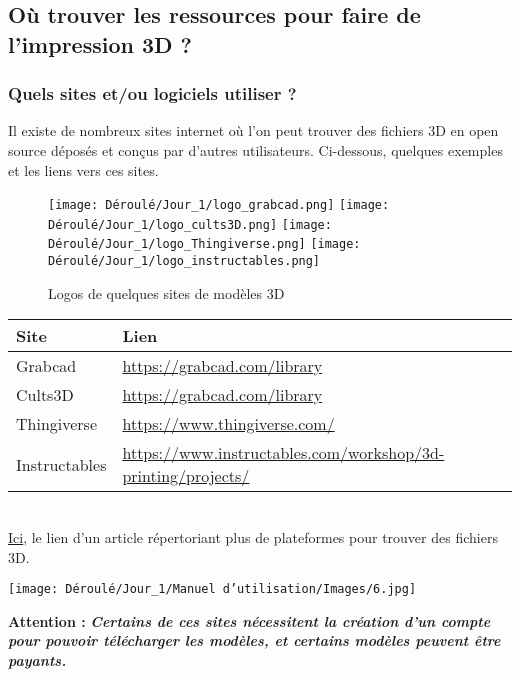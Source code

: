 \subsection{Où trouver les ressources pour faire de l'impression 3D ?}

\subsubsection{Quels sites et/ou logiciels utiliser ?}
\begin{flushleft}
    Il existe de nombreux sites internet où l'on peut trouver des fichiers 3D en open source déposés et conçus par d'autres utilisateurs. Ci-dessous, quelques exemples et les liens vers ces sites.\\
\end{flushleft}

\begin{flushleft}
    \begin{figure}[!h]
        \begin{center}
        \texttt{[image: Déroulé/Jour\_1/logo\_grabcad.png]}
        \texttt{[image: Déroulé/Jour\_1/logo\_cults3D.png]}
        \texttt{[image: Déroulé/Jour\_1/logo\_Thingiverse.png]}
        \texttt{[image: Déroulé/Jour\_1/logo\_instructables.png]}\\
        \caption[Sites de modèles 3D]{Logos de quelques sites de modèles 3D}
        \label{fig:my_label}
        \end{center}
    \end{figure}
    
    
    \vskip0.5cm
    \begin{tabular}{|l|l|}
        \hline Site & Lien\\
        \hline Grabcad & \url{https://grabcad.com/library}\\
        \hline Cults3D & \url{https://grabcad.com/library}\\
        \hline Thingiverse & \url{https://www.thingiverse.com/}\\
        \hline Instructables & \url{https://www.instructables.com/workshop/3d-printing/projects/}\\
        \hline
    \end{tabular}\\\vskip0.5cm
    \href{https://all3dp.com/fr/1/ficher-stl-3d-gratuit-modele-3d-imprimante-3d/}{Ici}, le lien d'un article répertoriant plus de plateformes pour trouver des fichiers 3D.\\\vspace{0.2cm}
    
    \begin{multicols}{2}
    \texttt{[image: Déroulé/Jour\_1/Manuel d'utilisation/Images/6.jpg]}
    
    \columnbreak
    
    \textbf{\large Attention : }\textbf{\textit{\large Certains de ces sites nécessitent la création d'un compte pour pouvoir télécharger les modèles, et certains modèles peuvent être payants.}}
    \end{multicols}
\end{flushleft}

